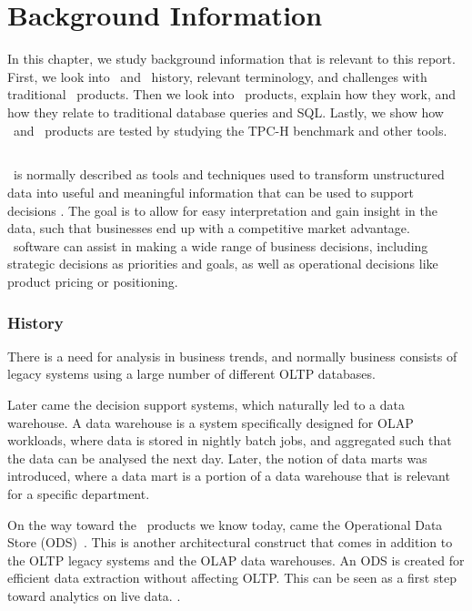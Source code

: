 \chapter{Background Information}
\label{chap:background}
In this chapter, we study background information that is relevant to this report. First, we look into \bi~and \bi~history, relevant terminology, and challenges with traditional \bi~products. Then we look into \bd~products, explain how they work, and how they relate to traditional database queries and SQL. Lastly, we show how \bi~and \bd~products are tested by studying the TPC-H benchmark and other tools.

\clearpage

\section{\bi}
\label{sec:Business Intelligence}
\bi~is normally described as tools and techniques used to transform unstructured data into useful and meaningful information that can be used to support decisions \cite{Wikipedia_contributors2015-ag}. The goal is to allow for easy interpretation and gain insight in the data, such that businesses end up with a competitive market advantage. \bi~software can assist in making a wide range of business decisions, including strategic decisions as priorities and goals, as well as operational decisions like product pricing or positioning.

\subsection{History}
\label{sub:History}
There is a need for analysis in business trends, and normally business consists of legacy systems using a large number of different OLTP databases.

Later came the decision support systems, which naturally led to a data warehouse. A data warehouse is a system specifically designed for OLAP workloads, where data is stored in nightly batch jobs, and aggregated such that the data can be analysed the next day. Later, the notion of data marts was introduced, where a data mart is a portion of a data warehouse that is relevant for a specific department.

On the way toward the \bd~products we know today, came the Operational Data Store (ODS)~\cite{Pavlic2002-nm}. This is another architectural construct that comes in addition to the OLTP legacy systems and the OLAP data warehouses. An ODS is created for efficient data extraction without affecting OLTP. This can be seen as a first step toward analytics on live data. .


